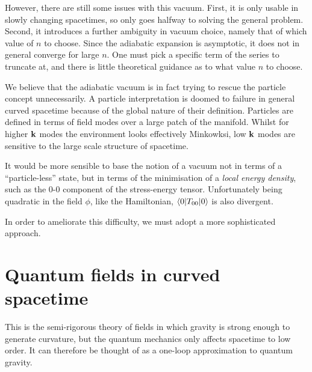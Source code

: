 However, there are still some issues with this vacuum. First, it is only usable in slowly changing spacetimes, so only goes halfway to solving the general problem. Second, it introduces a further ambiguity in vacuum choice, namely that of which value of \(n\) to choose. Since the adiabatic expansion is asymptotic, it does not in general converge for large \(n\). One must pick a specific term of the series to truncate at, and there is little theoretical guidance as to what value \(n\) to choose.

We believe that the adiabatic vacuum is in fact trying to rescue the particle concept unnecessarily. A particle interpretation is doomed to failure in general curved spacetime because of the global nature of their definition. Particles are defined in terms of field modes over a large patch of the manifold. Whilst for higher \(\mathbf{k}\) modes the environment looks effectively Minkowksi, low \(\mathbf{k}\) modes are sensitive to the large scale structure of spacetime.

It would be more sensible to base the notion of a vacuum not in terms of a ``particle-less'' state, but in terms of the minimisation of a {\em local energy density}, such as the \(0\)-\(0\) component of the stress-energy tensor. Unfortunately being quadratic in the field \(\phi\), like the Hamiltonian, \(\left\langle0\middle|T_{00}\middle|0\right\rangle\) is also divergent.

In order to ameliorate this difficulty, we must adopt a more sophisticated approach. 

\section{Quantum fields in curved spacetime} 
\label{sec:QFTCST}
This is the semi-rigorous theory of fields in which gravity is strong enough to generate curvature, but the quantum mechanics only affects spacetime to low order. It can therefore be thought of as a one-loop approximation to quantum gravity.

